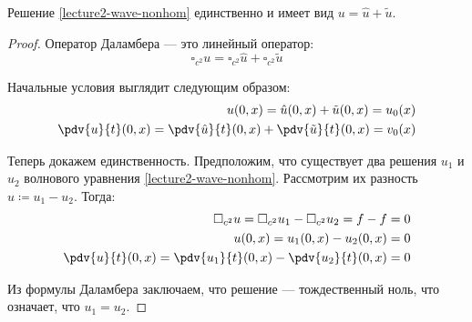 \begin{thm}
  Решение \eqref{lecture2-wave-nonhom} единственно и имеет вид $u = \hat{u} + \tilde{u}$.
\end{thm}

\begin{proof}
  Оператор Даламбера --- это линейный оператор:
  \begin{equation*}
    \square_{c^2} u = \square_{c^2} \hat{u} + \square_{c^2} \tilde{u}
  \end{equation*}
  
  Начальные условия выглядит следующим образом:
  \begin{align*}
    u(0, x) = \hat{u}(0, x) + \tilde{u}(0, x) = u_0(x) \\
    \pdv{u}{t}(0, x) = \pdv{\hat{u}}{t}(0, x) + \pdv{\tilde{u}}{t}(0, x) = v_0(x)
  \end{align*}
  
  Теперь докажем единственность. Предположим, что существует два решения $u_1$ и $u_2$ волнового уравнения \eqref{lecture2-wave-nonhom}. Рассмотрим их разность $u \coloneqq u_1 - u_2$. Тогда:
  \begin{align*}
    \square_{c^2} u = \square_{c^2} u_1 - \square_{c^2} u_2 = f - f = 0 \\
    u(0, x) = u_1(0, x) - u_2(0, x) = 0 \\
    \pdv{u}{t} (0, x) = \pdv{u_1}{t} (0, x) - \pdv{u_2}{t} (0, x) = 0
  \end{align*}
  
  Из формулы Даламбера заключаем, что решение --- тождественный ноль, что означает, что $u_1 = u_2$.
\end{proof}